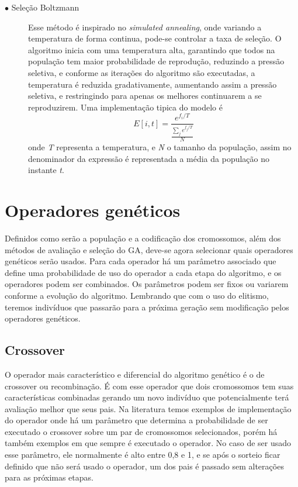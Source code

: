 \begin{description}
\item[$\bullet$ Seleção Boltzmann] \text{}

Esse método é inspirado no \textit{simulated annealing}, onde variando a temperatura de forma continua, pode-se controlar a taxa de seleção. O algoritmo inicia com uma temperatura alta, garantindo que todos na população tem maior probabilidade de reprodução, reduzindo a pressão seletiva, e conforme as iterações do algoritmo são executadas, a temperatura é reduzida gradativamente, aumentando assim a pressão seletiva, e restringindo para apenas os melhores continuarem a se reproduzirem. Uma implementação tipica do modelo é \[ E[i,t] = \frac{e^{f_i/T}}{\frac{\sum_j e^{f_j/T}}{N}}\] onde \textit{T} representa a temperatura, e \textit{N} o tamanho da população, assim no denominador da expressão é representada a média da população no instante \textit{t}. \cite{Mitchell1996}

\end{description}

\section{Operadores genéticos}

Definidos como serão a população e a codificação dos cromossomos, além dos métodos de avaliação e seleção do GA, deve-se agora selecionar quais operadores genéticos serão usados. Para cada operador há um parâmetro associado que define uma probabilidade de uso do operador a cada etapa do algoritmo, e os operadores podem ser combinados. Os parâmetros podem ser fixos ou variarem conforme a evolução do algoritmo. Lembrando que com o uso do elitismo, teremos indivíduos que passarão para a próxima geração sem modificação pelos operadores genéticos.

\subsection{Crossover}
O operador mais característico e diferencial do algoritmo genético é o de crossover ou recombinação. É com esse operador que dois cromossomos tem suas características combinadas gerando um novo indivíduo que potencialmente terá avaliação melhor que seus pais. Na literatura temos exemplos de implementação do operador onde há um parâmetro que determina a probabilidade de ser executado o crossover sobre um par de cromossomos selecionados, porém há também exemplos em que sempre é executado o operador. No caso de ser usado esse parâmetro, ele normalmente é alto entre 0,8 e 1, e se após o sorteio ficar definido que não será usado o operador, um dos pais é passado sem alterações para as próximas etapas.

